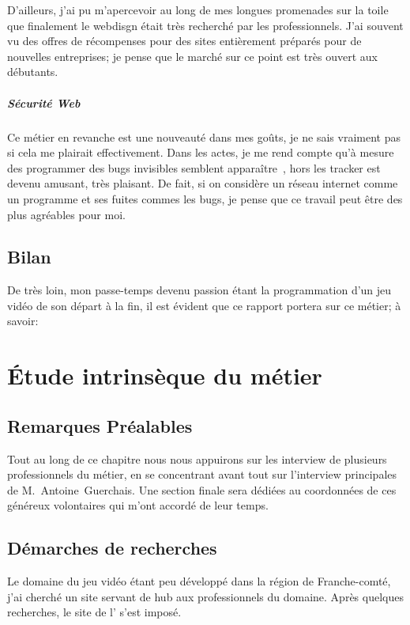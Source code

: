 \documentclass[12pt, a4paper]{report} %
\begin{document}
D'ailleurs, j'ai pu m'apercevoir au long de mes longues promenades sur la toile que finalement le webdisgn était très recherché par les professionnels. J'ai souvent vu des offres de récompenses pour des sites entièrement préparés pour de nouvelles entreprises; je pense que le marché sur ce point est très ouvert aux débutants. 

\paragraph{Sécurité Web}
Ce métier en revanche est une nouveauté dans mes goûts, je ne sais vraiment pas si cela me plairait effectivement. Dans les actes, je me rend compte qu'à mesure des programmer des bugs \og invisibles \fg semblent apparaître~\emph{}, hors les tracker est devenu amusant, très plaisant. De fait, si on considère un réseau internet comme un programme et ses fuites commes les bugs, je pense que ce travail peut être des plus agréables pour moi.

\section{Bilan}
De très loin, mon passe-temps devenu passion étant la programmation d'un jeu vidéo de son départ à la fin, il est évident que ce rapport portera sur ce métier; à savoir: 


\chapter{Étude intrinsèque du métier }
\section*{Remarques Préalables}
Tout au long de ce chapitre nous nous appuirons sur les interview de plusieurs professionnels du métier, en se concentrant avant tout sur l'interview principales de M.~Antoine~Guerchais. Une section finale sera dédiées au coordonnées de ces généreux volontaires qui m'ont accordé de leur temps.

\section{Démarches de recherches}
Le domaine du jeu vidéo étant peu développé dans la région de Franche-comté, j'ai cherché un site servant de hub aux professionnels du domaine. Après quelques recherches, le site de l' \href{http://www.afjv.com/index.php}{} s'est imposé. 
\end{document}
